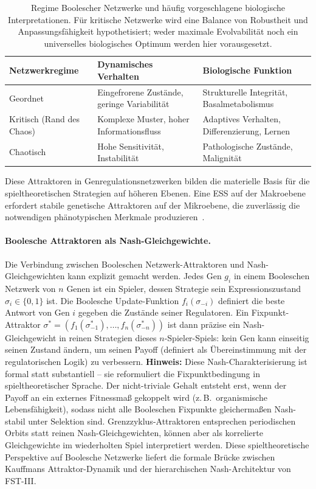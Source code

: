 \documentclass[12pt,a4paper]{article}
\theoremstyle{remark}
\begin{document}
\begin{table}[htbp]
\centering
\caption{Regime Boolescher Netzwerke und häufig vorgeschlagene biologische Interpretationen. Für kritische Netzwerke wird eine Balance von Robustheit und Anpassungsfähigkeit hypothetisiert; weder maximale Evolvabilität noch ein universelles biologisches Optimum werden hier vorausgesetzt.}
\label{tab:network-regimes}
\begin{tabularx}{\textwidth}{@{}L{0.22\textwidth} L{0.28\textwidth} Y@{}}
\toprule
\textbf{Netzwerkregime} & \textbf{Dynamisches Verhalten} & \textbf{Biologische Funktion} \\
\midrule
Geordnet & Eingefrorene Zustände, geringe Variabilität & Strukturelle Integrität, Basalmetabolismus \\
Kritisch (Rand des Chaos) & Komplexe Muster, hoher Informationsfluss & Adaptives Verhalten, Differenzierung, Lernen \\
Chaotisch & Hohe Sensitivität, Instabilität & Pathologische Zustände, Malignität \\
\bottomrule
\end{tabularx}
\end{table}

Diese Attraktoren in Genregulationsnetzwerken bilden die materielle Basis für die spieltheoretischen Strategien auf höheren Ebenen. Eine ESS auf der Makroebene erfordert stabile genetische Attraktoren auf der Mikroebene, die zuverlässig die notwendigen phänotypischen Merkmale produzieren~\citep{BooleanMicroarray,KauffmanOrigins}.

\paragraph{Boolesche Attraktoren als Nash-Gleichgewichte.}
Die Verbindung zwischen Booleschen Netzwerk-Attraktoren und Nash-Gleichgewichten kann explizit gemacht werden. Jedes Gen $g_i$ in einem Booleschen Netzwerk von $n$ Genen ist ein \glqq Spieler\grqq{}, dessen Strategie sein Expressionszustand $\sigma_i \in \{0, 1\}$ ist. Die Boolesche Update-Funktion $f_i(\sigma_{-i})$ definiert die beste Antwort von Gen $i$ gegeben die Zustände seiner Regulatoren. Ein Fixpunkt-Attraktor $\sigma^* = (f_1(\sigma^*_{-1}), \dots, f_n(\sigma^*_{-n}))$ ist dann präzise ein Nash-Gleichgewicht in reinen Strategien dieses $n$-Spieler-Spiels: kein Gen kann einseitig seinen Zustand ändern, um seinen \glqq Payoff\grqq{} (definiert als Übereinstimmung mit der regulatorischen Logik) zu verbessern. \textbf{Hinweis:} Diese Nash-Charakterisierung ist formal statt substantiell -- sie reformuliert die Fixpunktbedingung in spieltheoretischer Sprache. Der nicht-triviale Gehalt entsteht erst, wenn der Payoff an ein externes Fitnessmaß gekoppelt wird (z.\,B.\ organismische Lebensfähigkeit), sodass nicht alle Booleschen Fixpunkte gleichermaßen \glqq Nash-stabil\grqq{} unter Selektion sind. Grenzzyklus-Attraktoren entsprechen periodischen Orbits statt reinen Nash-Gleichgewichten, können aber als korrelierte Gleichgewichte im wiederholten Spiel interpretiert werden. Diese spieltheoretische Perspektive auf Boolesche Netzwerke liefert die formale Brücke zwischen Kauffmans Attraktor-Dynamik und der hierarchischen Nash-Architektur von FST-III.
\end{document}
